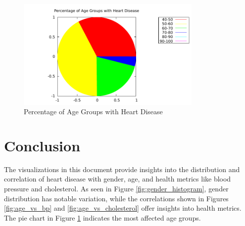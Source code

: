 \documentclass{article}
\begin{document}
	\begin{figure}[h]
		\centering
		\includegraphics[width=0.8\textwidth]{4d.pdf}
		\caption{Percentage of Age Groups with Heart Disease}
		\label{fig:age_group_pie}
	\end{figure}
	
	\section{Conclusion}
	The visualizations in this document provide insights into the distribution and correlation of heart disease with gender, age, and health metrics like blood pressure and cholesterol. As seen in Figure \ref{fig:gender_histogram}, gender distribution has notable variation, while the correlations shown in Figures \ref{fig:age_vs_bp} and \ref{fig:age_vs_cholesterol} offer insights into health metrics. The pie chart in Figure \ref{fig:age_group_pie} indicates the most affected age groups.
	
\end{document}
